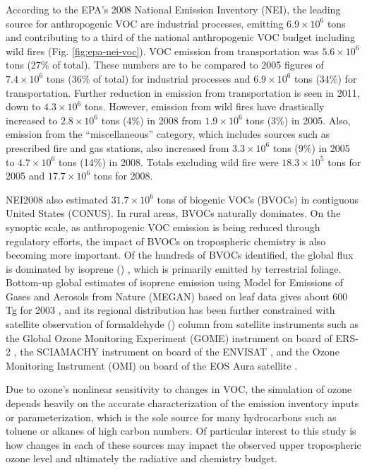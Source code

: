 	According to the EPA's 2008 National Emission Inventory (NEI), the leading source for anthropogenic VOC are industrial processes, emitting $6.9\times10^6$ tons and contributing to a third of the national anthropogenic VOC budget including wild fires (Fig. \ref{fig:epa-nei-voc}). VOC emission from transportation was $5.6\times10^6$ tons (27\% of total). These numbers are to be compared to 2005 figures of $7.4\times10^6$ tons (36\% of total) for industrial processes and $6.9\times10^6$ tons (34\%) for transportation. Further reduction in emission from transportation is seen in 2011, down to $4.3\times10^6$ tons. However, emission from wild fires have drastically increased to $2.8\times10^6$ tons (4\%) in 2008 from $1.9\times10^6$ tons (3\%) in 2005. Also, emission from the ``miscellaneous'' category, which includes sources such as prescribed fire and gas stations, also increased from $3.3\times10^6$ tons (9\%) in 2005 to $4.7\times10^6$ tons (14\%) in 2008. Totals excluding wild fire were $18.3\times10^5$ tons for 2005 and $17.7\times10^6$ tons for 2008.

	NEI2008 also estimated $31.7\times10^6$ tons of biogenic VOCs (BVOCs) in contiguous United States (CONUS). In rural areas, BVOCs naturally dominates. On the synoptic scale, as anthropogenic VOC emission is being reduced through regulatory efforts, the impact of BVOCs on tropospheric chemistry is also becoming more important. Of the hundreds of BVOCs identified, the global flux is dominated by isoprene () \citep{Guenther:2006kl}, which is primarily emitted by terrestrial foliage. Bottom-up global estimates of isoprene emission using Model for Emissions of Gases and Aerosols from Nature (MEGAN) based on leaf data gives about 600 Tg for 2003 \citep{Guenther:2006kl}, and its regional distribution has been further constrained with satellite observation of formaldehyde () column from satellite instruments such as the Global Ozone Monitoring Experiment (GOME) instrument on board of ERS-2 \citep{Palmer:2001nx, Palmer:2003cr,Palmer:2006qf},  the SCIAMACHY instrument on board of the ENVISAT  \citep{Dufour:2009fk, De-Smedt:2008uq, De-Smedt:2010kx}, and the Ozone Monitoring Instrument (OMI) on board of the EOS Aura satellite \citep{Millet:2008oq, Marais:2012kl}.

	Due to ozone's nonlinear sensitivity to changes in VOC, the simulation of ozone depends heavily on the accurate characterization of the emission inventory inputs or parameterization, which is the sole source for many hydrocarbons such as toluene or alkanes of high carbon numbers. Of particular interest to this study is how changes in each of these sources may impact the observed upper tropospheric ozone level and ultimately the radiative and chemistry budget.


